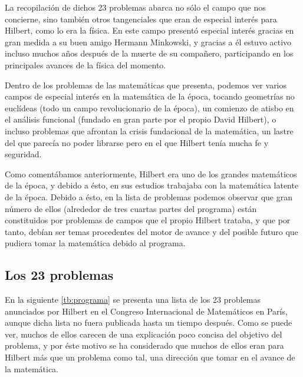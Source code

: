 La recopilación de dichos 23 problemas abarca no sólo el campo que nos concierne, sino también otros tangenciales que eran de especial 
interés para Hilbert, como lo era la física. En este campo presentó especial interés gracias en gran medida a su buen amigo Hermann Minkowski,
y gracias a él estuvo activo incluso muchos años después de la muerte de su compañero, participando en los principales avances de la física del momento.

Dentro de los problemas de las matemáticas que presenta, podemos ver varios campos de especial interés en la matemática de la época, tocando geometrías no euclídeas
(todo un campo revolucionario de la época), un comienzo de atisbo en el análisis funcional (fundado en gran parte por el propio David Hilbert),
o incluso problemas que afrontan la crisis fundacional de la matemática, un lastre del que parecía no poder librarse pero en el que Hilbert 
tenía mucha fe y seguridad.

Como comentábamos anteriormente, Hilbert era uno de los grandes matemáticos de la época, y debido a ésto, en sus estudios trabajaba con la 
matemática latente de la época. Debido a ésto, en la lista de problemas podemos observar que gran número de ellos (alrededor de tres cuartas partes del
programa) están constituidos por problemas de campos que el propio Hilbert trataba, y que por tanto, debían ser temas procedentes del motor de avance
y del posible futuro que pudiera tomar la matemática debido al programa. 

  
\subsection{Los 23 problemas}

En la siguiente \autoref{tb:programa} se presenta una lista de los 23 problemas anunciados por Hilbert en el Congreso Internacional de Matemáticos en París,
aunque dicha lista no fuera publicada hasta un tiempo después. Como se puede ver, muchos de ellos carecen de una explicación poco concisa del objetivo del problema,
y por éste motivo se ha considerado que muchos de ellos eran para Hilbert más que un problema como tal, una dirección que tomar en el avance de la matemática.

